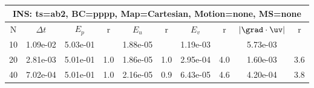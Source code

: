 
\begin{tabular}{|c|c|c|c|c|c|c|c|c|c|} \hline
 \multicolumn{10}{|c|}{INS: ts=ab2, BC=pppp, Map=Cartesian, Motion=none, MS=none } \\ \hline 
     N  &   $\Delta t$ & $E_p$   &  r  &   $E_u$   &   r    &   $E_v$   & r   &  $|\grad\cdot\uv|$  & r   \\ \hline 
  10   &  1.09e-02  &   5.03e-01  &        &   1.88e-05  &        &   1.19e-03  &        &   5.73e-03  &        \\ 
  20   &  2.81e-03  &   5.01e-01  & 1.0  &   1.86e-05  & 1.0  &   2.95e-04  & 4.0  &   1.60e-03  & 3.6  \\ 
  40   &  7.02e-04  &   5.01e-01  & 1.0  &   2.16e-05  & 0.9  &   6.43e-05  & 4.6  &   4.20e-04  & 3.8  \\ 
 \hline 
\end{tabular}
